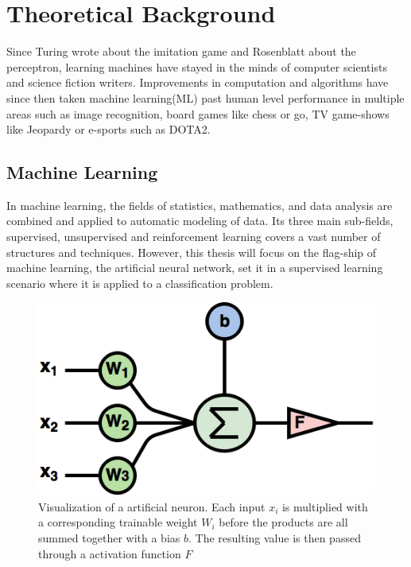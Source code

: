 \chapter{Theoretical Background}
Since Turing wrote about the imitation game\cite{imitationgame} and Rosenblatt about the perceptron\cite{perceptron}, learning machines have stayed in the minds of computer scientists and science fiction writers. 
Improvements in computation and algorithms have since then taken machine learning(ML) past human level performance in multiple areas such as image recognition\cite{youtubecats}\cite{deepface}, board games like chess\cite{alphazero} or go\cite{alphago}, TV game-shows like Jeopardy\cite{jeopardy} or e-sports such as DOTA2\cite{dota2}.

\section{Machine Learning}
\label{background:ML}
 
In machine learning, the fields of statistics, mathematics, and data analysis are combined and applied to automatic modeling of data. Its three main sub-fields, supervised, unsupervised and reinforcement learning covers a vast number of structures and techniques. However, this thesis will focus on the flag-ship of machine learning, the artificial neural network,  set it in a supervised learning scenario where it is applied to a classification problem.

\begin{figure}[ht] 
\centering
\includegraphics[width=0.7\linewidth]{Chapters/2.Background/figures/artificial_neuron.png}
\caption[Visualization of a artificial neuron]{Visualization of a artificial neuron. Each input \(x_{i}\) is multiplied with a corresponding trainable weight \(W_{i}\) before the products are all summed together with a bias \(b\). The resulting value is then passed through a activation function \(F\)}
\label{fig:artificialneuron}
\end{figure}

